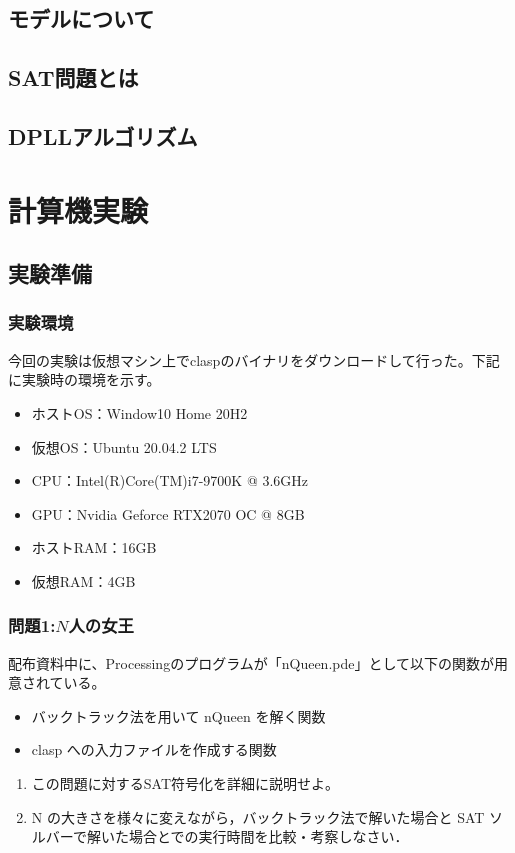 \documentclass[dvipdfmx]{jsarticle}
\begin{document}
\subsection{モデルについて}
\subsection{SAT問題とは}
\subsection{DPLLアルゴリズム}
\section{計算機実験}
\subsection{実験準備}
  \subsubsection{実験環境}
  今回の実験は仮想マシン上でclaspのバイナリをダウンロードして行った。下記に実験時の環境を示す。
  \begin{itemize}
    \item ホストOS：Window10 Home 20H2
    \item 仮想OS：Ubuntu 20.04.2 LTS
    \item CPU：Intel(R)Core(TM)i7-9700K @ 3.6GHz
    \item GPU：Nvidia Geforce RTX2070 OC @ 8GB
    \item ホストRAM：16GB
    \item 仮想RAM：4GB
  \end{itemize}
\subsubsection{問題1:$N$人の女王}
配布資料中に、Processingのプログラムが「nQueen.pde」として以下の関数が用意されている。
\begin{itemize}
  \item バックトラック法を用いて nQueen を解く関数
  \item clasp への入力ファイルを作成する関数
\end{itemize}
\begin{enumerate}
  \item この問題に対するSAT符号化を詳細に説明せよ。
  \item N の大きさを様々に変えながら，バックトラック法で解いた場合と SAT ソルバーで解いた場合とでの実行時間を比較・考察しなさい．
\end{enumerate}
\end{document}
